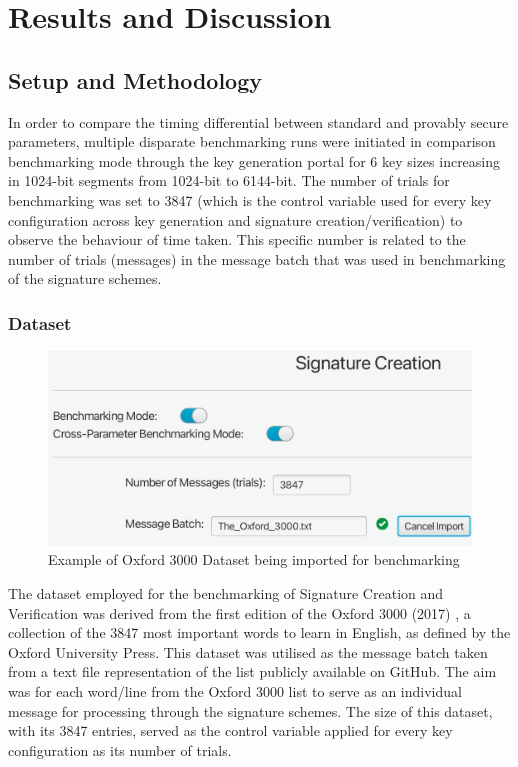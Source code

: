 \documentclass[]{final_report}
\theoremstyle{definition}
\begin{document}
\chapter{Results and Discussion}

\section{Setup and Methodology}
In order to compare the timing differential between standard and provably secure parameters, multiple disparate benchmarking runs were initiated in comparison benchmarking mode through the key generation portal for 6 key sizes increasing in 1024-bit segments from 1024-bit to 6144-bit. The number of trials for benchmarking was set to 3847 (which is the control variable used for every key configuration across key generation and signature creation/verification) to observe the behaviour of time taken. This specific number is related to the number of trials (messages) in the message batch that was used in benchmarking of the signature schemes.

\subsection{Dataset}

\begin{figure}[H]
    \centering
    \includegraphics[width=\textwidth]{main_pictures/ui/dataset.png}
    \caption{Example of Oxford 3000 Dataset being imported for benchmarking}
\end{figure}

The dataset employed for the benchmarking of Signature Creation and Verification was derived from the first edition of the Oxford 3000 (2017) \cite{Oxford3000_2022}, a collection of the 3847 most important words to learn in English, as defined by the Oxford University Press. This dataset was utilised as the message batch taken from a text file representation of the list \cite{Oxford3000_GitHub} publicly available on GitHub. The aim was for each word/line from the Oxford 3000 list to serve as an individual message for processing through the signature schemes. The size of this dataset, with its 3847 entries, served as the control variable applied for every key configuration as its number of trials. 
\end{document}
